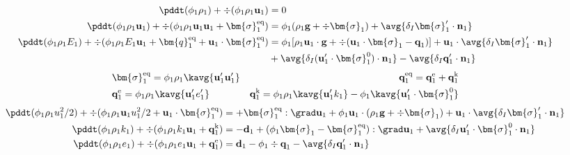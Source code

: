 \begin{align}
    \label{eq:dt_&vg_rho}
    \pddt (\phi_1 \rho_1)  
    + \div (
        \phi_1 \rho_1\textbf{u}_1
    )
    &= 
    0\\
    \label{eq:dt_&vg_rhou_1}
    \pddt (\phi_1 \rho_1\textbf{u}_1)  
    + \div (
        \phi_1 \rho_1\textbf{u}_1\textbf{u}_1
        + \bm{\sigma}_1^\text{eq}
    )
    &= 
    \phi_1 (\rho_1 \textbf{g} 
    + \div \bm{\sigma}_1 ) 
    +  \avg{\delta_I \bm{\sigma}_1' \cdot \textbf{n}_1}\\
    \label{eq:dt_&vg_rhoE_1}
    \pddt (\phi_1\rho_1E_1)  
    + \div (
        \phi_1\rho_1E_1\textbf{u}_1
        + \bm{q}_1^\text{eq}
        + \textbf{u}_1 \cdot \bm{\sigma}_1^\text{eq}
        )
    &= 
    \phi_1 [\rho_1\textbf{u}_1 \cdot \textbf{g} 
    + \div(\textbf{u}_1 \cdot \bm{\sigma}_1 - \textbf{q}_1)]
    + \textbf{u}_1 \cdot\avg{\delta_I \bm{\sigma}_1'\cdot \textbf{n}_1}\nonumber\\
    &+ \avg{\delta_I (\textbf{u}_1' \cdot \bm{\sigma}_1^0 )\cdot \textbf{n}_1}
    - \avg{\delta_I\textbf{q}_1'\cdot \textbf{n}_1}
\end{align} 
\begin{align*}
    &\bm{\sigma}_1^\text{eq}
    = \phi_1\rho_1\kavg{\textbf{u}_1'\textbf{u}_1'}
    &\textbf{q}_1^\text{eq}
    =\textbf{q}_1^\text{e} +\textbf{q}_1^\text{k}  \\
    &\textbf{q}_1^\text{e}
    = \phi_1\rho_1 \kavg{\textbf{u}_1' e_1'} 
    &\textbf{q}_1^\text{k}
    = \phi_1\rho_1 \kavg{\textbf{u}_1' k_1} 
    - \phi_1\kavg{\textbf{u}_1' \cdot \bm{\sigma}_1^0}
\end{align*}
\begin{align}
    \pddt (\phi_1 \rho_1u_1^2/2)  
    + \div (
        \phi_1 \rho_1\textbf{u}_1u_1^2/2
        + \textbf{u}_1 \cdot \bm{\sigma}_1^\text{eq}
    )
    &= 
    + \bm{\sigma}_1^\text{eq} : \grad \textbf{u}_1
    + \phi_1  \textbf{u}_1\cdot(\rho_1 \textbf{g} + \div \bm{\sigma}_1) 
    +  \textbf{u}_1\cdot \avg{\delta_I \bm{\sigma}_1' \cdot \textbf{n}_1}\\
    \pddt (\phi_1\rho_1k_1)  
    + \div (
        \phi_1\rho_1k_1\textbf{u}_1
        + \textbf{q}_1^\text{k} 
        )
    &= 
    - \textbf{d}_1
    + (\phi_1 \bm{\sigma}_1 - \bm{\sigma}_1^\text{eq} ): \grad \textbf{u}_1
    + \avg{\delta_I \textbf{u}_1' \cdot \bm{\sigma}_1^0 \cdot \textbf{n}_1}\\
    \pddt (\phi_1\rho_1e_1)  
    + \div (
        \phi_1 \rho_1e_1\textbf{u}_1
        +
        \textbf{q}_1^\text{e} 
        )
    &= 
    \textbf{d}_1
    - \phi_1 \div \textbf{q}_1
    - \avg{\delta_I \textbf{q}_1' \cdot \textbf{n}_1} 
\end{align}


